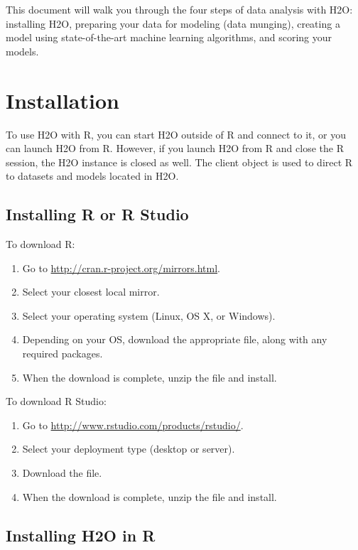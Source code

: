 This document will walk you through the four steps of data analysis with H2O: installing H2O, preparing your data for modeling (data munging), creating a model using state-of-the-art machine learning algorithms, and scoring your models. 

\section{Installation}

To use H2O with R, you can start H2O outside of R and connect to it, or you can launch H2O from R. However, if you launch H2O from R and close the R session, the H2O instance is closed as well. The client object is used to direct R to datasets and models located in H2O.

\subsection{Installing R or R Studio}

To download R:
\begin{enumerate}
\item Go to \url{http://cran.r-project.org/mirrors.html}. 
\item Select your closest local mirror. 
\item Select your operating system (Linux, OS X, or Windows). 
\item Depending on your OS, download the appropriate file, along with any required packages. 
\item When the download is complete, unzip the file and install. \\
\end{enumerate}

To download R Studio: 

\begin{enumerate}
\item Go to \url{http://www.rstudio.com/products/rstudio/}. 
\item Select your deployment type (desktop or server). 
\item Download the file. 
\item When the download is complete, unzip the file and install.
\end{enumerate}


\subsection{Installing H2O in R}

